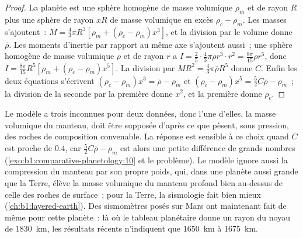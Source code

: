 \begin{proof}
La planète est une sphère homogène de masse volumique $\rho_m$ et de rayon $R$
plus une sphère de rayon $xR$ de masse volumique en excès $\rho_c - \rho_m$. Les
masses s'ajoutent~:
$M = \tfrac43\pi R^3[\rho_m + (\rho_c - \rho_m)x^3]$, et la division par le
volume donne $\bar\rho$. Les moments d'inertie par rapport au même axe
s'ajoutent aussi~; une sphère homogène de masse volumique $\rho$ et de rayon $r$
a
$I = \tfrac25\cdot\tfrac43\pi\rho r^3\cdot r^2 = \tfrac{8\pi}{15}\rho r^5$,
donc $I = \tfrac{8\pi}{15}R^5[\rho_m + (\rho_c - \rho_m)x^5]$. La division par
$MR^2 = \tfrac43\pi\bar\rho R^5$ donne $C$. Enfin les deux équations s'écrivent
$(\rho_c - \rho_m)x^3 = \bar\rho - \rho_m$ et $(\rho_c - \rho_m)x^5 =
\tfrac52C\bar\rho - \rho_m$~; la division de la seconde par la première donne
$x^2$, et la première donne $\rho_c$.
\end{proof}

Le modèle a trois inconnues pour deux données, donc l'une d'elles, la masse
volumique du manteau, doit être supposée d'après ce que pèsent, sous pression,
des roches de composition convenable. La réponse est sensible à ce choix quand
$C$ est proche de $0.4$, car $\tfrac52C\bar\rho - \rho_m$ est alors une petite
différence de grands nombres (\cref{exo:b1:comparative-planetology:10} et le
problème). Le modèle ignore aussi la compression du manteau par son propre
poids, qui, dans une planète aussi grande que la Terre, élève la masse
volumique du manteau profond bien au-dessus de celle des roches de surface~;
pour la Terre, la sismologie fait bien mieux (\cref{ch:b1:layered-earth}). Des
sismomètres posés sur Mars ont maintenant fait de même pour cette planète~: là
où le tableau planétaire donne un rayon du noyau de \qty{1830}{km}, les
résultats récents n'indiquent que \qty{1650}{km} à \qty{1675}{km}.

